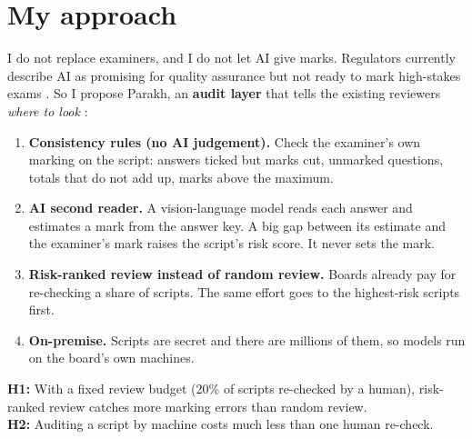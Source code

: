 \section{My approach}
I do not replace examiners, and I do not let AI give marks. Regulators currently describe AI as promising for quality
assurance but not ready to mark high-stakes exams \citep{ofqual2026}. So I propose Parakh, an \textbf{audit layer} that tells the
existing reviewers \emph{where to look} :
\begin{enumerate}
  \item \textbf{Consistency rules (no AI judgement).} Check the examiner's own marking on the script: answers ticked but
        marks cut, unmarked questions, totals that do not add up, marks above the maximum.
  \item \textbf{AI second reader.} A vision-language model reads each answer and estimates a mark from the answer key.
        A big gap between its estimate and the examiner's mark raises the script's risk score. It never sets the mark.
  \item \textbf{Risk-ranked review instead of random review.} Boards already pay for re-checking a share of scripts. The
        same effort goes to the highest-risk scripts first.
  \item \textbf{On-premise.} Scripts are secret and there are millions of them, so models run on the board's own machines.
\end{enumerate}

\begin{keybox}
\textbf{H1:} With a fixed review budget (20\% of scripts re-checked by a human), risk-ranked review catches more marking
errors than random review. \\
\textbf{H2:} Auditing a script by machine costs much less than one human re-check. 
\end{keybox}
